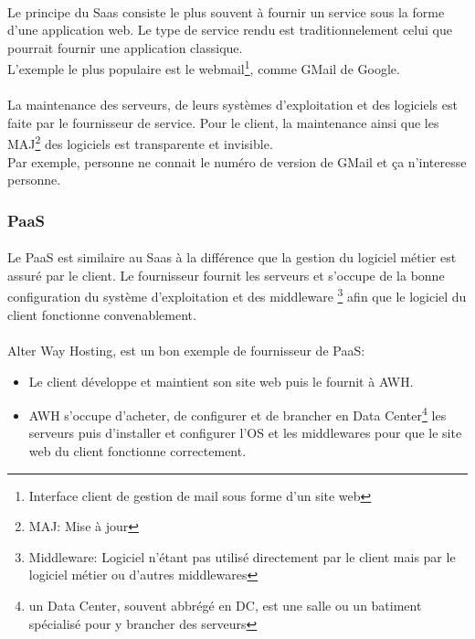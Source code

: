 \paragraph*{}
Le principe du Saas consiste le plus souvent à fournir un service sous la forme d'une application web.
Le type de service rendu est traditionnelement celui que pourrait fournir une application classique.
\\
L'exemple le plus populaire est le webmail\footnote{Interface client de gestion de mail sous forme d'un site web}, comme GMail de Google.

\paragraph*{}
La maintenance des serveurs, de leurs systèmes d'exploitation et des logiciels est faite par le fournisseur de service.
Pour le client, la maintenance ainsi que les MAJ\footnote{MAJ: Mise à jour} des logiciels est transparente et invisible.
\\
Par exemple, personne ne connait le numéro de version de GMail et ça n'interesse personne.

\subsubsection{PaaS}
\paragraph*{}
Le PaaS est similaire au Saas à la différence que la gestion du logiciel métier est assuré par le client.
Le fournisseur fournit les serveurs et s'occupe de la bonne configuration du système d'exploitation et des middleware
\footnote{Middleware: Logiciel n'étant pas utilisé directement par le client mais par le logiciel métier ou d'autres middlewares} afin
que le logiciel du client fonctionne convenablement.

\paragraph*{}
Alter Way Hosting, est un bon exemple de fournisseur de PaaS: \\
\begin{itemize}
\item 	Le client développe et maintient son site web puis le fournit à AWH.\\
\item 	AWH s'occupe d'acheter, de configurer et de brancher en Data Center\footnote{un Data Center, souvent abbrégé en DC, est une salle
		ou un batiment spécialisé pour y brancher des serveurs} les serveurs puis d'installer et configurer l'OS et les middlewares pour que
		le site web du client fonctionne correctement.
\end{itemize}

